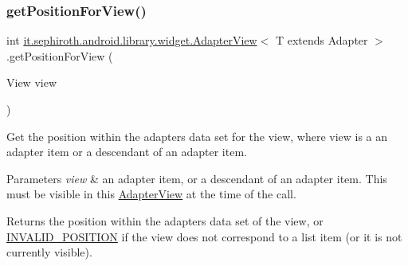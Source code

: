 \mbox{\label{classit_1_1sephiroth_1_1android_1_1library_1_1widget_1_1_adapter_view_a0177b193e83d643073123fb44ac84ec8}} 
\subsubsection{\texorpdfstring{get\+Position\+For\+View()}{getPositionForView()}}
{\footnotesize\ttfamily int \hyperlink{classit_1_1sephiroth_1_1android_1_1library_1_1widget_1_1_adapter_view}{it.\+sephiroth.\+android.\+library.\+widget.\+Adapter\+View}$<$ T extends Adapter $>$.get\+Position\+For\+View (\begin{DoxyParamCaption}\item[{View}]{view }\end{DoxyParamCaption})}

Get the position within the adapter\textquotesingle{}s data set for the view, where view is a an adapter item or a descendant of an adapter item.


\begin{DoxyParams}{Parameters}
{\em view} & an adapter item, or a descendant of an adapter item. This must be visible in this \hyperlink{classit_1_1sephiroth_1_1android_1_1library_1_1widget_1_1_adapter_view}{Adapter\+View} at the time of the call. \\
\hline
\end{DoxyParams}
\begin{DoxyReturn}{Returns}
the position within the adapter\textquotesingle{}s data set of the view, or \hyperlink{classit_1_1sephiroth_1_1android_1_1library_1_1widget_1_1_adapter_view_a2751b7d592638baeaf149f6da0d4e598}{I\+N\+V\+A\+L\+I\+D\+\_\+\+P\+O\+S\+I\+T\+I\+ON} if the view does not correspond to a list item (or it is not currently visible). 
\end{DoxyReturn}
\mbox{\label{classit_1_1sephiroth_1_1android_1_1library_1_1widget_1_1_adapter_view_aba45e9479002d14addd73bc398ddd9fc}} 
